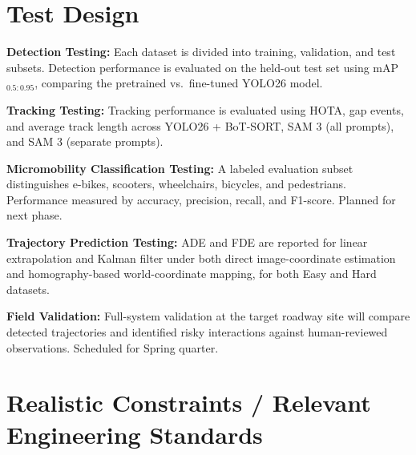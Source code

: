 \documentclass[12pt,letterpaper]{article}
\begin{document}
\section{Test Design}

\textbf{Detection Testing:} Each dataset is divided into training, validation, and test subsets. Detection performance is evaluated on the held-out test set using mAP$_{0.5:0.95}$, comparing the pretrained vs.\ fine-tuned YOLO26 model.

\textbf{Tracking Testing:} Tracking performance is evaluated using HOTA, gap events, and average track length across YOLO26 + BoT-SORT, SAM 3 (all prompts), and SAM 3 (separate prompts).

\textbf{Micromobility Classification Testing:} A labeled evaluation subset distinguishes e-bikes, scooters, wheelchairs, bicycles, and pedestrians. Performance measured by accuracy, precision, recall, and F1-score. Planned for next phase.

\textbf{Trajectory Prediction Testing:} ADE and FDE are reported for linear extrapolation and Kalman filter under both direct image-coordinate estimation and homography-based world-coordinate mapping, for both Easy and Hard datasets.

\textbf{Field Validation:} Full-system validation at the target roadway site will compare detected trajectories and identified risky interactions against human-reviewed observations. Scheduled for Spring quarter.

\section{Realistic Constraints / Relevant Engineering Standards}
\end{document}
